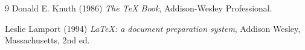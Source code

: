 \documentclass{article}
\begin{document}
\begin{thebibliography}{9}
	Donald E. Knuth (1986) \emph{The \TeX{} Book}, Addison-Wesley Professional.
	
	Leslie Lamport (1994) \emph{\LaTeX: a document preparation system}, Addison
	Wesley, Massachusetts, 2nd ed.
\end{thebibliography}
\end{document}
